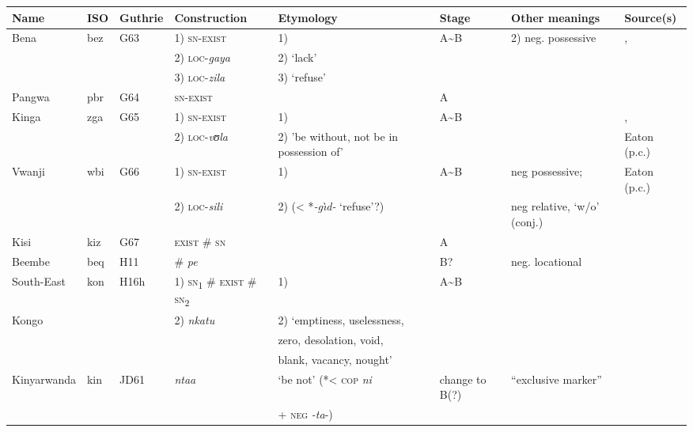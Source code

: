 \documentclass[output=paper,draft,draftmode,colorlinks,citecolor=brown]{langscibook}
\begin{document}
\begin{paperappendix}
\begin{sidewaystable}[p]%
\scriptsize
\begin{tabularx}{\textwidth}{llllllQQ}
\lsptoprule
{Name}	&{ISO}	&{Guthrie}	&{Construction}&{Etymology}		&{Stage}	&{Other meanings}&{Source(s)}\\
\midrule
{Bena}	&{bez}	&{G63}	&1) \textsc{sn-exist}&1) \textendash						&A{\textasciitilde}B&2) neg. possessive						&\citet{Morrison2011},\\
				&				&				&2) \textsc{loc}-\textit{gaya}&2) `lack'						&		&												&\citet{Eaton2015a}\\
				&				&				&3) \textsc{loc}-\textit{zila}&3) `refuse'\\
{Pangwa}	&{pbr}	&{G64}	&\textsc{sn-exist}&\textendash								&A{}	&												&\citet{Stirnimann1983}\\
{Kinga} 	&{zga}	&{G65} 	&1) \textsc{sn-exist}& 1) \textendash							&A{\textasciitilde}B&										&\citet{Wolff1905},\\
				&				&				&2) \textsc{loc}-\textit{vʊla}&2) 'be without, not be in possession of'					&		&												&Eaton (p.c.)\\
{Vwanji} 	&{wbi}	&{G66} 	&1) \textsc{sn-exist}&1) \textendash						&A{\textasciitilde}B&neg possessive;					&Eaton (p.c.)\\
				&				&				&2) \textsc{loc}-\textit{sili}&2) (< *\textit{-g{\`\i}d-} `refuse'?)&		&neg relative, `w/o' (conj.)\\
{Kisi}		&{kiz}		&{G67}	&\textsc{exist \# sn}&\textendash							&A{}	&												&\citet{Ngonyani2011}\\
{Beembe} 	&{beq}	&{H11}	&\# \textit{pe}	&\textendash								&B?	&neg. locational 									&\citet{Nsayi1984}\\
{South-East}&{kon}	&{H16h}	&1) \textsc{sn}\textsubscript{1} \# \textsc{exist} \# \textsc{sn}\textsubscript{2}&1) \textendash	&A{\textasciitilde}B&		&\citet{Bentley1887}\\
{Kongo}	&				&				&2) \textit{nkatu}									&2) `emptiness, uselessness,\\
				&				&				&												&zero, desolation, void,\\
				&				&				&												&blank, vacancy, nought'\\
{Kinyarwanda}&{kin}	&{JD61}	&\textit{ntaa} 	&`be not' (*< \textsc{cop} \textit{ni}		&change to B(?) 	&``exclusive marker''								&\citet{Kimenyi1980}\\
				&				&				&				&+ \textsc{neg} \textit{-ta}-)\\

\end{tabularx}
\end{sidewaystable}
\end{paperappendix}
\end{document}
